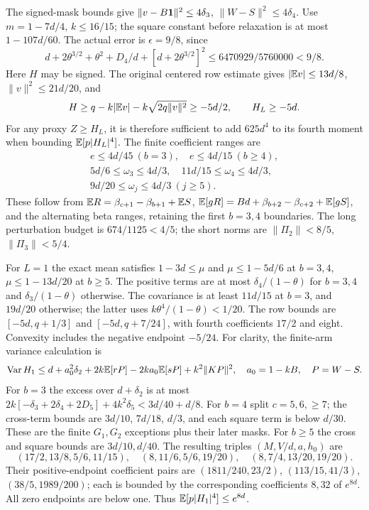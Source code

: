 The signed-mask bounds give
$\|v-B\mathbf1\|^2\le4\delta_{3}$, $\|W-S\|^2\le4\delta_{4}$.
Use $m=1-7d/4$, $k\le16/15$;
the square constant before relaxation is at most $1-107d/60$.
The actual error is $\epsilon=9/8$, since
\[
 d+2\theta^{3/2}+\theta^2+D_4/d+[d+2\theta^{3/2}]^2
 \le6470929/5760000<9/8.
\]
Here $H$ may be signed. The original centered row estimate gives
$|\mathbb E v|\le13d/8$, $\|v\|^2\le21d/20$, and
\[
 H\ge q-k|\mathbb E v|-k\sqrt{2q\|v\|^2}\ge-5d/2,
 \qquad H_L\ge-5d.
\]
For any proxy $Z\ge H_L$, it is therefore sufficient to add $625d^4$
to its fourth moment when bounding $\mathbb E[p|H_L|^4]$.
The finite coefficient ranges are
\begin{gather*}
 e\le4d/45\ (b=3),\quad e\le4d/15\ (b\ge4),\\
 5d/6\le\omega_3\le4d/3,\quad11d/15\le\omega_4\le4d/3,\\
 9d/20\le\omega_j\le4d/3\ (j\ge5).
\end{gather*}
These follow from $\mathbb E R=\beta_{c+1}-\beta_{b+1}+\mathbb E S$,
$\mathbb E[gR]=Bd+\beta_{b+2}-\beta_{c+2}+\mathbb E[gS]$,
and the alternating beta ranges, retaining the first $b=3,4$ boundaries.
The long perturbation budget is $674/1125<4/5$;
the short norms are $\|\Pi_2\|<8/5$, $\|\Pi_3\|<5/4$.

For $L=1$ the exact mean satisfies $1-3d\le\mu$ and
$\mu\le1-5d/6$ at $b=3,4$, $\mu\le1-13d/20$ at $b\ge5$.
The positive terms are at most $\delta_{4}/(1-\theta)$ for $b=3,4$
and $\delta_{3}/(1-\theta)$ otherwise.
The covariance is at least $11d/15$ at $b=3$, and $19d/20$ otherwise;
the latter uses $k\theta^4/(1-\theta)<1/20$.
The row bounds are $[-5d,q+1/3]$ and $[-5d,q+7/24]$,
with fourth coefficients $17/2$ and eight. Convexity includes the
negative endpoint $-5/24$.
For clarity, the finite-arm variance calculation is
\[
 \operatorname{Var}H_1\le d+a_0^2\delta_{2}+2k\mathbb E[rP]
              -2ka_0\mathbb E[sP]+k^2\|KP\|^2,\quad
 a_0=1-kB,\quad P=W-S.
\]
For $b=3$ the excess over $d+\delta_{2}$ is at most
$2k[-\delta_{3}+2\delta_{4}+2D_5]+4k^2\delta_{5}<3d/40+d/8$.
For $b=4$ split $c=5,6,\ge7$; the cross-term bounds are
$3d/10$, $7d/18$, $d/3$, and each square term is below $d/30$.
These are the finite $G_1,G_2$ exceptions plus their later masks.
For $b\ge5$ the cross and square bounds are $3d/10,d/40$.
The resulting triples $(M,V/d,a,h_0)$ are
\[
 (17/2,13/8,5/6,11/15),\quad
 (8,11/6,5/6,19/20),\quad(8,7/4,13/20,19/20).
\]
Their positive-endpoint coefficient pairs are
$(1811/240,23/2)$, $(113/15,41/3)$, $(38/5,1989/200)$;
each is bounded by the corresponding coefficients $8,32$ of $e^{8d}$.
All zero endpoints are below one. Thus $\mathbb E[p|H_1|^4]\le e^{8d}$.

